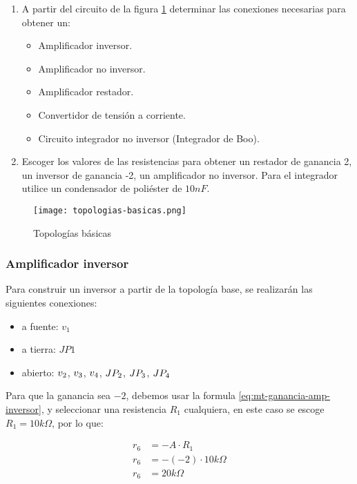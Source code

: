 \begin{enumerate}
    \item A partir del circuito de la figura \ref{fig:topologias-basicas} determinar las conexiones necesarias para obtener un:
        \begin{itemize}
            \item Amplificador inversor.
            \item Amplificador no inversor.
            \item Amplificador restador.
            \item Convertidor de tensión a corriente.
            \item Circuito integrador no inversor (Integrador de Boo).
        \end{itemize}

    \item Escoger los valores de las resistencias para obtener un restador de ganancia 2, un inversor de ganancia -2, un amplificador no inversor. Para el integrador utilice un condensador de poliéster de $10nF$.

\end{enumerate}

\begin{figure}[ht]
    \centering
    \texttt{[image: topologias-basicas.png]}
    \caption{Topologías básicas}
    \label{fig:topologias-basicas}
\end{figure}

\subsubsection{Amplificador inversor}

Para construir un inversor a partir de la topología base, se realizarán las siguientes conexiones:

\begin{itemize}
    \item a fuente: $v_1$
    \item a tierra: $JP1$
    \item abierto: $\volt{2}$, $\volt{3}$, $\volt{4}$, $\jumper{2}$, $\jumper{3}$, $\jumper{4}$
\end{itemize}

Para que la ganancia sea $-2$, debemos usar la formula \ref{eq:mt-ganancia-amp-inversor}, y seleccionar una resistencia $R_1$ cualquiera, en este caso se escoge $R_1 = 10k\Omega$, por lo que:

\begin{align*}
    r_6 &= -A \cdot R_1 \\
    r_6 &= - (-2) \cdot 10k\Omega \\
    r_6 &= 20k\Omega
\end{align*}

